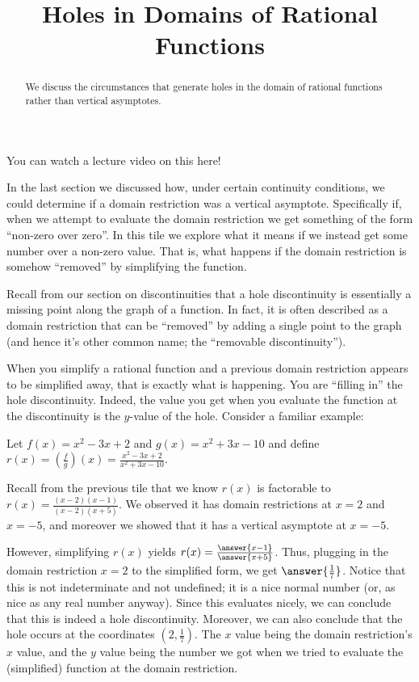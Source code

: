 \documentclass{ximera}
\title{Holes in Domains of Rational Functions}
\begin{document}
\begin{abstract}
    We discuss the circumstances that generate holes in the domain of rational functions rather than vertical asymptotes.
\end{abstract}
\maketitle

You can watch a lecture video on this here!


In the last section we discussed how, under certain continuity conditions, we could determine if a domain restriction was a vertical asymptote. Specifically if, when we attempt to evaluate the domain restriction we get something of the form ``non-zero over zero''. In this tile we explore what it means if we instead get some number over a non-zero value. That is, what happens if the domain restriction is somehow ``removed'' by simplifying the function.

Recall from our section on discontinuities that a hole discontinuity is essentially a missing point along the graph of a function. In fact, it is often described as a domain restriction that can be ``removed'' by adding a single point to the graph (and hence it's other common name; the ``removable discontinuity'').

When you simplify a rational function and a previous domain restriction appears to be simplified away, that is exactly what is happening. You are ``filling in'' the hole discontinuity. Indeed, the value you get when you evaluate the function at the discontinuity is the $y$-value of the hole. Consider a familiar example:

\begin{example}
    Let $f(x) = x^2 - 3x + 2$ and $g(x) = x^2 + 3x - 10$ and define $r(x) = \left(\frac{f}{g}\right)(x) = \frac{x^2 - 3x + 2}{x^2 + 3x - 10}$.
    
    Recall from the previous tile that we know $r(x)$ is factorable to $r(x)=\frac{(x-2)(x-1)}{(x-2)(x+5)}$. We observed it has domain restrictions at $x=2$ and $x=-5$, and moreover we showed that it has a vertical asymptote at $x=-5$. 
    
    However, simplifying $r(x)$ yields $r(x)=\frac{\answer{x-1}}{\answer{x+5}}$. Thus, plugging in the domain restriction $x=2$ to the simplified form, we get $\answer{\frac{1}{7}}$. Notice that this is not indeterminate and not undefined; it is a nice normal number (or, as nice as any real number anyway). Since this evaluates nicely, we can conclude that this is indeed a hole discontinuity. Moreover, we can also conclude that the hole occurs at the coordinates $\left(2,\frac{1}{7}\right)$. The $x$ value being the domain restriction's $x$ value, and the $y$ value being the number we got when we tried to evaluate the (simplified) function at the domain restriction.
\end{example}
\end{document}
